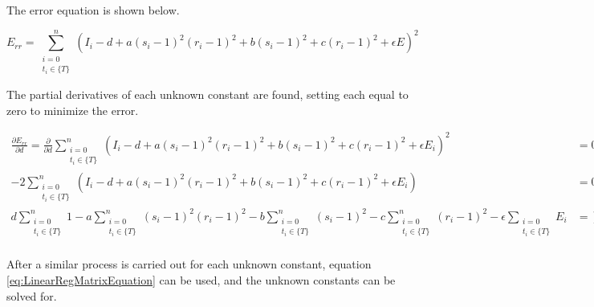 The error equation is shown below.

\begin{equation*}
    E_{rr}=\sum_{
            \substack{i=0\\ t_i\in \{ T \}}
        }^n \left(
        I_i
        -d
        +a(s_i-1)^2(r_i-1)^2
        +b(s_i-1)^2
        +c(r_i-1)^2
        +\epsilon E
    \right)^2
\end{equation*}

The partial derivatives of each unknown constant are found, setting each equal to zero to minimize the error.

\begin{equation*}
    \begin{split}
        \frac{\partial E_{rr}}{\partial d}=
        \frac{\partial}{\partial d}\sum_{
                \substack{i=0\\ t_i\in \{ T \}}
            }^n \left(
            I_i
            -d
            +a(s_i-1)^2(r_i-1)^2
            +b(s_i-1)^2
            +c(r_i-1)^2
            +\epsilon E_i
        \right)^2&=0\\
        -2\sum_{
                \substack{i=0\\ t_i\in \{ T \}}
            }^n \left(
            I_i
            -d
            +a(s_i-1)^2(r_i-1)^2
            +b(s_i-1)^2
            +c(r_i-1)^2
            +\epsilon E_i
        \right)&=0\\
        d \sum_{\substack{i=0\\ t_i\in \{ T \}}}^n 1 
        -a \sum_{\substack{i=0\\ t_i\in \{ T \}}}^n (s_i-1)^2(r_i-1)^2
        -b \sum_{\substack{i=0\\ t_i\in \{ T \}}}^n (s_i-1)^2
        -c \sum_{\substack{i=0\\ t_i\in \{ T \}}}^n (r_i-1)^2
        -\epsilon \sum_{\substack{i=0\\ t_i\in \{ T \}}} E_i
        &=
        \sum_{\substack{i=0\\ t_i\in \{ T \}}}^n I_i\\
    \end{split}
\end{equation*}

After a similar process is carried out for each unknown constant, equation \ref{eq:LinearRegMatrixEquation} can be used, and the unknown constants can be solved for.

